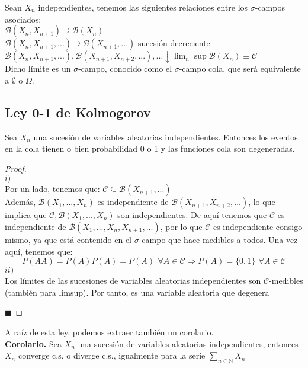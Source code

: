 \documentclass[12pt,a4paper]{book}
\newcommand*{\qed}{\hfill\ensuremath{\blacksquare}}
\begin{document}
Sean ${X_n}$ independientes, tenemos las siguientes relaciones entre los $\sigma$-campos asociados:\\

$\mathcal{B}(X_n, X_{n+1}) \supseteq \mathcal{B}(X_n)$\\
$\mathcal{B}(X_n, X_{n+1}, ...) \supseteq \mathcal{B}(X_{n+1}, ...)$ sucesión decreciente\\
$\mathcal{B}(X_n, X_{n+1}, ...), \mathcal{B}(X_{n+1}, X_{n+2}, ...), ... \downarrow \lim_n \sup \mathcal{B}(X_n) \equiv \mathcal{C}$\\

Dicho límite es un $\sigma$-campo, conocido como el $\sigma$-campo cola, que será equivalente a $\emptyset$ o $\Omega$.

\subsection{Ley 0-1 de Kolmogorov}
Sea $X_n$ una sucesión de variables aleatorias independientes. Entonces los eventos en la cola tienen o bien probabilidad 0 o 1 y las funciones cola son degeneradas.
\begin{proof}$\,$\\
$i)$\\
Por un lado, tenemos que: $\mathcal{C} \subseteq \mathcal{B}(X_{n+1}, ...)$\\
Además, $\mathcal{B} (X_1, ..., X_n)$ es independiente de $\mathcal{B}(X_{n+1}, X_{n+2},...)$, lo que implica que $\mathcal{C}, \mathcal{B}(X_1,...,X_n)$ son independientes. De aquí tenemos que $\mathcal{C}$ es independiente de $\mathcal{B}(X_1,...,X_n,X_{n+1},...)$, por lo que $\mathcal{C}$ es independiente consigo mismo, ya que está contenido en el $\sigma$-campo que hace medibles a todos. Una vez aquí, tenemos que:
$$ P(AA) = P(A)P(A) = P(A)\, \ \forall A \in \mathcal{C} \Rightarrow P(A) = \{0,1\}\,\ \forall A \in \mathcal{C}$$
$ii)$\\
Los límites de las sucesiones de variables aleatorias independientes son $\mathcal{C}$-medibles (también para limsup). Por tanto, es una variable aleatoria que degenera

\qed
\end{proof}

A raíz de esta ley, podemos extraer también un corolario.\\

\textbf{Corolario. }Sea $X_n$ una sucesión de variables aleatorias independientes, entonces $X_n$ converge c.s. o diverge c.s., igualmente para la serie $\sum_{n\in\mathbb{N}} X_n$
\end{document}
